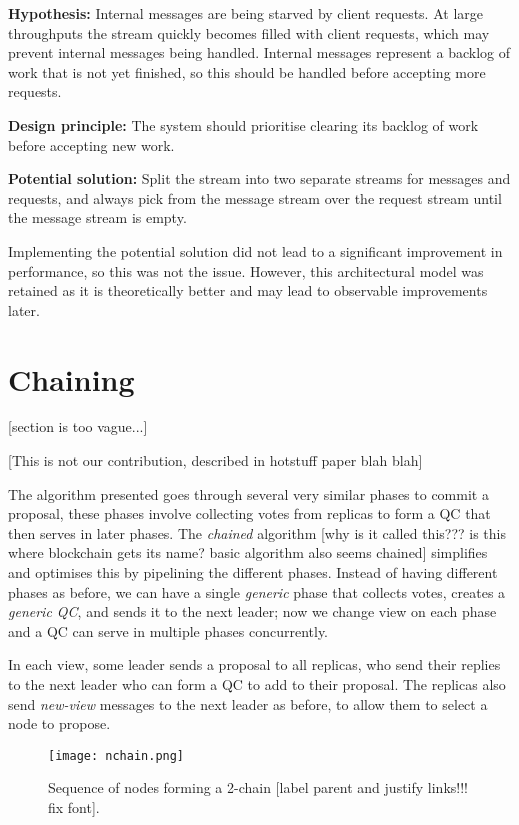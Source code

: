 \textbf{Hypothesis: } Internal messages are being starved by client requests. At large throughputs the stream quickly becomes filled with client requests, which may prevent internal messages being handled. Internal messages represent a backlog of work that is not yet finished, so this should be handled before accepting more requests.

\textbf{Design principle: } The system should prioritise clearing its backlog of work before accepting new work.

\textbf{Potential solution: } Split the stream into two separate streams for messages and requests, and always pick from the message stream over the request stream until the message stream is empty.

Implementing the potential solution did not lead to a significant improvement in performance, so this was not the issue. However, this architectural model was retained as it is theoretically better and may lead to observable improvements later.

\section{Chaining} \label{chaining}

[section is too vague...]

[This is not our contribution, described in hotstuff paper blah blah]

The algorithm presented goes through several very similar phases to commit a proposal, these phases involve collecting votes from replicas to form a QC that then serves in later phases. The \textit{chained} algorithm [why is it called this??? is this where blockchain gets its name? basic algorithm also seems chained] simplifies and optimises this by pipelining the different phases. Instead of having different phases as before, we can have a single \textit{generic} phase that collects votes, creates a \textit{generic QC}, and sends it to the next leader; now we change view on each phase and a QC can serve in multiple phases concurrently.

In each view, some leader sends a proposal to all replicas, who send their replies to the next leader who can form a QC to add to their proposal. The replicas also send \textit{new-view} messages to the next leader as before, to allow them to select a node to propose.

\begin{figure}[h!]
\centering
\texttt{[image: nchain.png]}
\caption{Sequence of nodes forming a 2-chain [label parent and justify links!!! fix font].}
\label{nchain}
\end{figure}

